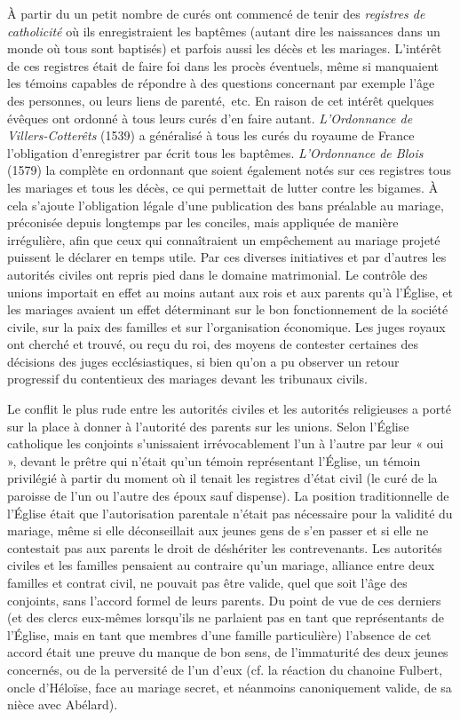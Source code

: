  À partir du  un petit nombre de curés ont commencé de tenir des \emph{registres de catholicité} où ils enregistraient les baptêmes (autant dire les naissances dans un monde où tous sont baptisés) et parfois aussi les décès et les mariages. L'intérêt de ces registres était de faire foi dans les procès éventuels, même si manquaient les témoins capables de répondre à des questions concernant par exemple l'âge des personnes, ou leurs liens de parenté,~etc. En raison de cet intérêt quelques évêques ont ordonné à tous leurs curés d'en faire autant. \emph{L'Ordonnance de Villers-Cotterêts} (1539) a généralisé à tous les curés du royaume de France l'obligation d'enregistrer par écrit tous les baptêmes. \emph{L'Ordonnance de Blois} (1579) la complète en ordonnant que soient également notés sur ces registres tous les mariages et tous les décès, ce qui permettait de lutter contre les bigames. À cela s'ajoute l'obligation légale d'une publication des bans préalable au mariage, préconisée depuis longtemps par les conciles, mais appliquée de manière irrégulière, afin que ceux qui connaîtraient un empêchement au mariage projeté puissent le déclarer en temps utile. Par ces diverses initiatives et par d'autres les autorités civiles ont repris pied dans le domaine matrimonial. Le contrôle des unions importait en effet au moins autant aux rois et aux parents qu'à l'Église, et les mariages avaient un effet déterminant sur le bon fonctionnement de la société civile, sur la paix des familles et sur l'organisation économique. Les juges royaux ont cherché et trouvé, ou reçu du roi, des moyens de contester certaines des décisions des juges ecclésiastiques, si bien qu'on a pu observer un retour progressif du contentieux des mariages devant les tribunaux civils. 

 Le conflit le plus rude entre les autorités civiles et les autorités religieuses a porté sur la place à donner à l'autorité des parents sur les unions. Selon l'Église catholique les conjoints s'unissaient irrévocablement l'un à l'autre par leur « oui », devant le prêtre qui n'était qu'un témoin représentant l'Église, un témoin privilégié à partir du moment où il tenait les registres d'état civil (le curé de la paroisse de l'un ou l'autre des époux sauf dispense). La position traditionnelle de l'Église était que l'autorisation parentale n'était pas nécessaire pour la validité du mariage, même si elle déconseillait aux jeunes gens de s'en passer et si elle ne contestait pas aux parents le droit de déshériter les contrevenants. Les autorités civiles et les familles pensaient au contraire qu'un mariage, alliance entre deux familles et contrat civil, ne pouvait pas être valide, quel que soit l'âge des conjoints, sans l'accord formel de leurs parents. Du point de vue de ces derniers (et des clercs eux-mêmes lorsqu'ils ne parlaient pas en tant que représentants de l'Église, mais en tant que membres d'une famille particulière) l'absence de cet accord était une preuve du manque de bon sens, de l'immaturité des deux jeunes concernés, ou de la perversité de l'un d'eux (cf. la réaction du chanoine Fulbert, oncle d'Héloïse, face au mariage secret, et néanmoins canoniquement valide, de sa nièce avec Abélard). 


